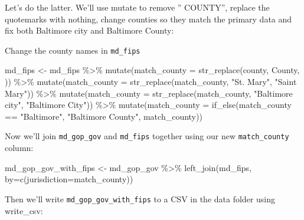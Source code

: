 \documentclass[
  letterpaper,
  DIV=11,
  numbers=noendperiod]{scrreprt}
\newenvironment{Shaded}{\begin{snugshade}}{\end{snugshade}}
\newcommand{\AttributeTok}[1]{\textcolor[rgb]{0.40,0.45,0.13}{#1}}
\newcommand{\FunctionTok}[1]{\textcolor[rgb]{0.28,0.35,0.67}{#1}}
\newcommand{\NormalTok}[1]{\textcolor[rgb]{0.00,0.23,0.31}{#1}}
\newcommand{\OtherTok}[1]{\textcolor[rgb]{0.00,0.23,0.31}{#1}}
\newcommand{\SpecialCharTok}[1]{\textcolor[rgb]{0.37,0.37,0.37}{#1}}
\newcommand{\StringTok}[1]{\textcolor[rgb]{0.13,0.47,0.30}{#1}}
\begin{document}
Let's do the latter. We'll use mutate to remove '' COUNTY'', replace the
quotemarks with nothing, change counties so they match the primary data
and fix both Baltimore city and Baltimore County:

Change the county names in \texttt{md\_fips}

\begin{Shaded}
\begin{Highlighting}[]
\NormalTok{md\_fips }\OtherTok{\textless{}{-}}\NormalTok{ md\_fips }\SpecialCharTok{\%\textgreater{}\%}
   \FunctionTok{mutate}\NormalTok{(}\AttributeTok{match\_county =} \FunctionTok{str\_replace}\NormalTok{(county, }\StringTok{\textquotesingle{} County\textquotesingle{}}\NormalTok{, }\StringTok{\textquotesingle{}\textquotesingle{}}\NormalTok{)) }\SpecialCharTok{\%\textgreater{}\%}
   \FunctionTok{mutate}\NormalTok{(}\AttributeTok{match\_county =} \FunctionTok{str\_replace}\NormalTok{(match\_county, }\StringTok{"St. Mary"}\NormalTok{, }\StringTok{"Saint Mary"}\NormalTok{)) }\SpecialCharTok{\%\textgreater{}\%}
   \FunctionTok{mutate}\NormalTok{(}\AttributeTok{match\_county =} \FunctionTok{str\_replace}\NormalTok{(match\_county, }\StringTok{"Baltimore city"}\NormalTok{, }\StringTok{"Baltimore City"}\NormalTok{)) }\SpecialCharTok{\%\textgreater{}\%}
   \FunctionTok{mutate}\NormalTok{(}\AttributeTok{match\_county =} \FunctionTok{if\_else}\NormalTok{(match\_county }\SpecialCharTok{==} \StringTok{"Baltimore"}\NormalTok{, }\StringTok{"Baltimore County"}\NormalTok{, match\_county))}
\end{Highlighting}
\end{Shaded}

Now we'll join \texttt{md\_gop\_gov} and \texttt{md\_fips} together
using our new \texttt{match\_county} column:

\begin{Shaded}
\begin{Highlighting}[]
\NormalTok{md\_gop\_gov\_with\_fips }\OtherTok{\textless{}{-}}\NormalTok{ md\_gop\_gov }\SpecialCharTok{\%\textgreater{}\%}
  \FunctionTok{left\_join}\NormalTok{(md\_fips, }\AttributeTok{by=}\FunctionTok{c}\NormalTok{(}\StringTok{\textquotesingle{}jurisdiction\textquotesingle{}}\OtherTok{=}\StringTok{\textquotesingle{}match\_county\textquotesingle{}}\NormalTok{))}
\end{Highlighting}
\end{Shaded}

Then we'll write \texttt{md\_gop\_gov\_with\_fips} to a CSV in the data
folder using write\_csv:
\end{document}
